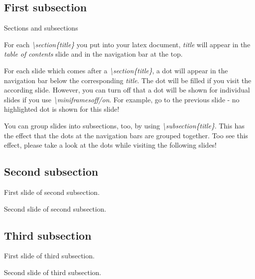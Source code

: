 \subsection{First subsection}

\begin{frame}{Sections and subsections}

  For each \textit{\textbackslash section\{title\}} you put into your latex document, \textit{title} will appear in the \textit{table of contents} slide and in the navigation bar at the top. \\
  
  \vspace{0.4cm}
  
  For each slide which comes after a \textit{\textbackslash section\{title\}}, a dot will appear in the navigation bar below the corresponding \textit{title}. The dot will be filled if you visit the according slide. However, you can turn  off that a dot will be shown for individual slides if you use \textit{\textbackslash miniframesoff/on}. For example, go to the previous slide - no highlighted dot is shown for this slide!
    
  \vspace{0.4cm}
  
  You can group slides into subsections, too, by using \textit{\textbackslash subsection\{title\}}. This has the effect that the dots at the navigation bars are grouped together. Too see this effect, please take a look at the dots while visiting the following slides!
  
\end{frame}

\subsection{Second subsection}

\begin{frame}{}

  First slide of second subsection.

\end{frame}

\begin{frame}{}

  Second slide of second subsection.

\end{frame}

\subsection{Third subsection}

\begin{frame}{}

  First slide of third subsection.

\end{frame}

\begin{frame}{}

  Second slide of third subsection.

\end{frame}